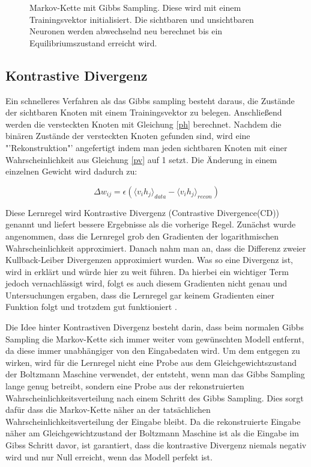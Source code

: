 \documentclass[12pt]{article}
\begin{document}
\begin{figure}[H]
	\center
	
	\caption{Markov-Kette mit Gibbs Sampling. Diese wird mit einem Trainingsvektor initialisiert. Die sichtbaren und unsichtbaren Neuronen werden abwechselnd neu berechnet bis ein Equilibriumszustand erreicht wird.}
	\label{Markov}
	\end{figure}


\subsection{Kontrastive Divergenz}

Ein schnelleres Verfahren als das Gibbs sampling besteht daraus, die Zustände der sichtbaren Knoten mit einem Trainingsvektor zu belegen. Anschließend werden die versteckten Knoten mit Gleichung \ref{ph} berechnet. Nachdem die binären Zustände der versteckten Knoten gefunden sind, wird eine "'Rekonstruktion"' angefertigt indem man jeden sichtbaren Knoten mit einer Wahrscheinlichkeit aus Gleichung \ref{pv} auf 1 setzt. Die Änderung in einem einzelnen Gewicht wird dadurch zu:

\begin{equation}
\Delta w_{ij} = \epsilon \left( \langle v_i h_j\rangle_{data} - \langle v_i h_j \rangle_{recon}\right)
\end{equation}

Diese Lernregel wird Kontrastive Divergenz (Contrastive Divergence(CD)) genannt und liefert bessere Ergebnisse als die vorherige Regel. Zunächst wurde angenommen, dass die  Lernregel grob den Gradienten der logarithmischen Wahrscheinlichkeit approximiert. Danach nahm man an, dass die Differenz zweier Kullback-Leiber Divergenzen approximiert wurden. Was so eine Divergenz ist, wird in \cite{KLD} erklärt und würde hier zu weit führen. Da hierbei ein wichtiger Term jedoch vernachlässigt wird, folgt es auch diesem Gradienten nicht genau und Untersuchungen ergaben, dass die Lernregel gar keinem Gradienten einer Funktion folgt und trotzdem gut funktioniert \cite{noconv}. 

Die Idee hinter Kontrastiven Divergenz besteht darin, dass beim normalen Gibbs Sampling die Markov-Kette sich immer weiter vom gewünschten Modell entfernt, da diese immer unabhängiger von den Eingabedaten wird. Um dem entgegen zu wirken, wird für die Lernregel nicht eine Probe aus dem Gleichgewichtszustand der Boltzmann Maschine verwendet, der entsteht, wenn man das Gibbs Sampling lange genug betreibt, sondern eine Probe aus der rekonstruierten Wahrscheinlichkeitsverteilung nach einem Schritt des Gibbs Sampling. Dies sorgt dafür dass die Markov-Kette näher an der tatsächlichen Wahrscheinlichkeitsverteilung der Eingabe bleibt. Da die rekonstruierte Eingabe näher am Gleichgewichtzustand der Boltzmann Maschine ist als die Eingabe im Gibss Schritt davor, ist garantiert, dass die kontrastive Divergenz niemals negativ wird und nur Null erreicht, wenn das Modell perfekt ist. \cite{digits}
\end{document}
